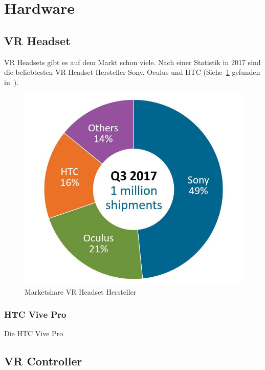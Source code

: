 \section{Hardware}

\subsection{VR Headset}\label{sec:vr-headset}

VR Headsets gibt es auf dem Markt schon viele.
Nach einer Statistik in 2017 sind die beliebtesten VR Headset Hersteller Sony, Oculus und HTC (Siehe~\ref{fig:vr_headset_manufacturer_marketshare}\cite{MARTINDALE_2017} gefunden in~\cite{CANKAYA_2019}).

\begin{figure}
    \includegraphics[scale=0.5]{pics/vr_headset_manufacturer_marketshare}
    \caption{Marketshare VR Headset Hersteller}
    \label{fig:vr_headset_manufacturer_marketshare}
\end{figure}

\subsubsection{HTC Vive Pro}

Die HTC Vive Pro

\subsection{VR Controller}\label{sec:vr-controller}

